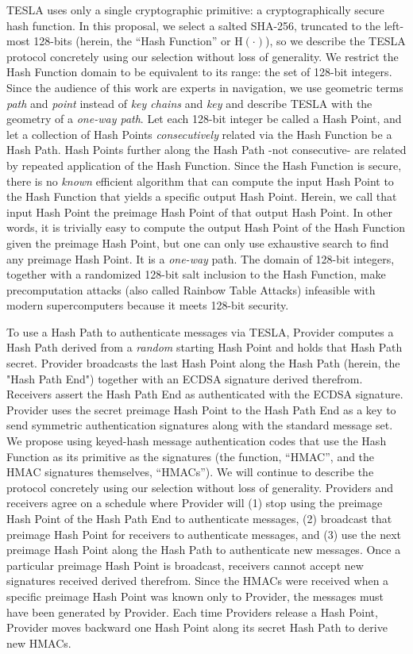 \documentclass[letterpaper,times]{IONconf/IONconf}
\begin{document}
TESLA uses only a single cryptographic primitive: a cryptographically secure hash function.
In this proposal, we select a salted SHA-256, truncated to the left-most 128-bits (herein, the ``Hash Function'' or $\textrm{H}(\cdot)$), so we describe the TESLA protocol concretely using our selection without loss of generality.
We restrict the Hash Function domain to be equivalent to its range: the set of 128-bit integers.
Since the audience of this work are experts in navigation, we use geometric terms {\em path} and {\em point} instead of {\em key chains} and {\em key} and describe TESLA with the geometry of a {\em one-way path}.
Let each 128-bit integer be called a Hash Point, and let a collection of Hash Points {\em consecutively} related via the Hash Function be a Hash Path.
Hash Points further along the Hash Path -not consecutive- are related by repeated application of the Hash Function.
Since the Hash Function is secure, there is no {\em known} efficient algorithm that can compute the input Hash Point to the Hash Function that yields a specific output Hash Point.
Herein, we call that input Hash Point the preimage Hash Point of that output Hash Point.
In other words, it is trivially easy to compute the output Hash Point of the Hash Function given the preimage Hash Point, but one can only use exhaustive search to find any preimage Hash Point.
It is a {\em one-way} path.
The domain of 128-bit integers, together with a randomized 128-bit salt inclusion to the Hash Function, make precomputation attacks (also called Rainbow Table Attacks) infeasible with modern supercomputers because it meets 128-bit security.

To use a Hash Path to authenticate messages via TESLA, Provider computes a Hash Path derived from a {\em random} starting Hash Point and holds that Hash Path secret.
Provider broadcasts the last Hash Point along the Hash Path (herein, the "Hash Path End") together with an ECDSA signature derived therefrom.
Receivers assert the Hash Path End as authenticated with the ECDSA signature.
Provider uses the secret preimage Hash Point to the Hash Path End as a key to send symmetric authentication signatures along with the standard message set.
We propose using keyed-hash message authentication codes that use the Hash Function as its primitive as the signatures (the function, ``HMAC'', and the HMAC signatures themselves, ``HMACs''). 
We will continue to describe the protocol concretely using our selection without loss of generality.
Providers and receivers agree on a schedule where Provider will (1) stop using the preimage Hash Point of the Hash Path End to authenticate messages, (2) broadcast that preimage Hash Point for receivers to authenticate messages, and (3) use the next preimage Hash Point along the Hash Path to authenticate new messages.
Once a particular preimage Hash Point is broadcast, receivers cannot accept new signatures received derived therefrom.
Since the HMACs were received when a specific preimage Hash Point was known only to Provider, the messages must have been generated by Provider.
Each time Providers release a Hash Point, Provider moves backward one Hash Point along its secret Hash Path to derive new HMACs.
\end{document}
